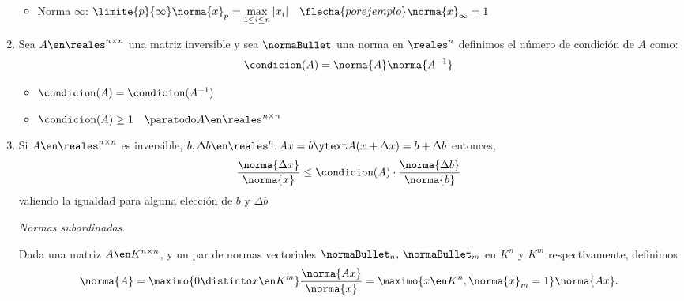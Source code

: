 \begin{enumerate}[label=\tiny\purple{\faIcon{snowman}}]
\begin{itemize}
          \item Norma $\infty$:
                $\limite{p}{\infty} \norma{x}_p = \max\limits_{1\leq i \leq n} |x_i|
                  \quad
                  \flecha{por ejemplo}
                  \norma{x}_{\infty} = 1 \quad$
        \end{itemize}

  \item Sea $A \en \reales^{n \times n}$ una matriz inversible y sea $\normaBullet$ una norma en
        $\reales^n$ definimos el número de condición de $A$ como:
        $$
          \condicion(A) = \norma{A}\norma{A^{-1}}
        $$
        \begin{itemize}
          \item $\condicion(A) = \condicion(A^{-1})$
          \item $\condicion(A) \geq 1 \quad \paratodo A \en \reales^{n \times n}$
        \end{itemize}
  \item Si $A \en \reales^{n \times n}$ es inversible, $b, \Delta b \en \reales^{n}, Ax = b \ytext A(x + \Delta x) = b + \Delta b$ entonces,
        $$
          \frac{\norma{\Delta x}}{\norma{x}} \leq \condicion(A) \cdot \frac{\norma{\Delta b}}{\norma{b}}
        $$
        valiendo la igualdad para alguna elección de $b$ y $\Delta b$

        \textit{Normas subordinadas}.

        Dada una matriz $A \en K^{n \times n}$, y un par de normas vectoriales $\normaBullet_n,\, \normaBullet_m$ en $K^n$ y $K^m$
        respectivamente, definimos
        $$
          \norma{A} =
          \maximo{0 \distinto x\en K^m} \frac{ \norma{Ax}}{\norma{x}} =
          \maximo{x \en K^n, \norma{x}_m = 1} \norma{Ax}.
        $$
\end{enumerate}


